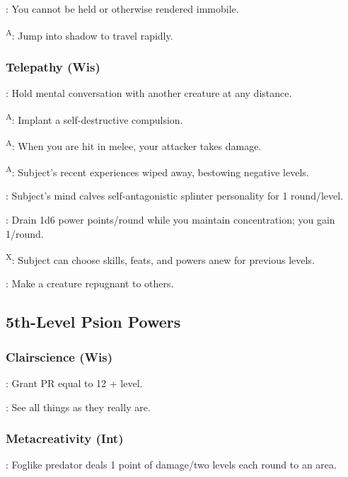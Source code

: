 : You cannot be held or otherwise rendered immobile.

\textsuperscript{A}: Jump into shadow to travel rapidly.


\subsubsection{Telepathy (Wis)}

: Hold mental conversation with another creature at any distance.

\textsuperscript{A}: Implant a self-destructive compulsion.

\textsuperscript{A}: When you are hit in melee, your attacker takes damage.

\textsuperscript{A}: Subject's recent experiences wiped away, bestowing negative levels.

: Subject's mind calves self-antagonistic splinter personality for 1 round/level.

: Drain 1d6 power points/round while you maintain concentration; you gain 1/round.

\textsuperscript{X}: Subject can choose skills, feats, and powers anew for previous levels.

: Make a creature repugnant to others.



\subsection{5th-Level Psion Powers}


\subsubsection{Clairscience (Wis)}

: Grant PR equal to 12 + level.

: See all things as they really are.


\subsubsection{Metacreativity (Int)}

: Foglike predator deals 1 point of damage/two levels each round to an area.


